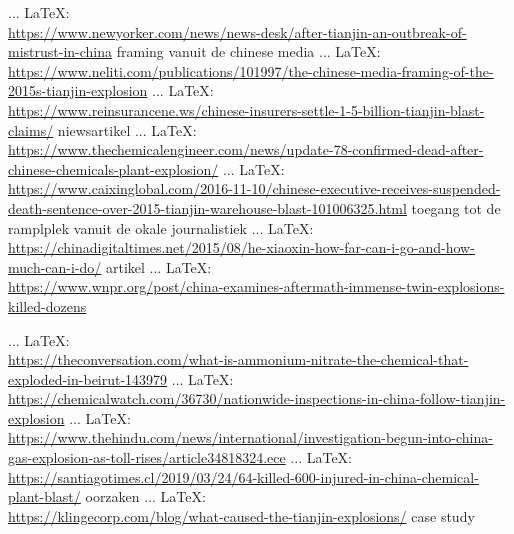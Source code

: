 \begin{thebibliography}{99}
{{{     ... \LaTeX:\\ \url{https://www.newyorker.com/news/news-desk/after-tianjin-an-outbreak-of-mistrust-in-china}
    framing vanuit de chinese media
     ... \LaTeX:\\ \url{https://www.neliti.com/publications/101997/the-chinese-media-framing-of-the-2015s-tianjin-explosion}
     ... \LaTeX:\\ \url{https://www.reinsurancene.ws/chinese-insurers-settle-1-5-billion-tianjin-blast-claims/}
    niewsartikel
     ... \LaTeX:\\ \url{https://www.thechemicalengineer.com/news/update-78-confirmed-dead-after-chinese-chemicals-plant-explosion/}
     ... \LaTeX:\\ \url{https://www.caixinglobal.com/2016-11-10/chinese-executive-receives-suspended-death-sentence-over-2015-tianjin-warehouse-blast-101006325.html}
    toegang tot de ramplplek vanuit de okale journalistiek
     ... \LaTeX:\\ \url{https://chinadigitaltimes.net/2015/08/he-xiaoxin-how-far-can-i-go-and-how-much-can-i-do/}
    artikel
     ... \LaTeX:\\ \url{https://www.wnpr.org/post/china-examines-aftermath-immense-twin-explosions-killed-dozens}

     ... \LaTeX:\\ \url{https://theconversation.com/what-is-ammonium-nitrate-the-chemical-that-exploded-in-beirut-143979}
     ... \LaTeX:\\ \url{https://chemicalwatch.com/36730/nationwide-inspections-in-china-follow-tianjin-explosion}
     ... \LaTeX:\\ \url{https://www.thehindu.com/news/international/investigation-begun-into-china-gas-explosion-as-toll-rises/article34818324.ece}
     ... \LaTeX:\\ \url{https://santiagotimes.cl/2019/03/24/64-killed-600-injured-in-china-chemical-plant-blast/}
    oorzaken
     ... \LaTeX:\\ \url{https://klingecorp.com/blog/what-caused-the-tianjin-explosions/}
    case study
    }}}
\end{thebibliography}
